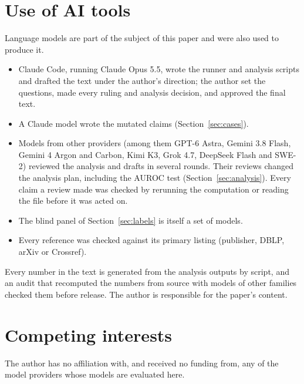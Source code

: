 \documentclass[11pt]{article}
\begin{document}
\section*{Use of AI tools}

Language models are part of the subject of this paper and were also used to produce it.
\begin{itemize}
  \item Claude Code, running Claude Opus 5.5, wrote the runner and analysis scripts and drafted the text under the author's direction; the author set the questions, made every ruling and analysis decision, and approved the final text.
  \item A Claude model wrote the mutated claims (Section~\ref{sec:cases}).
  \item Models from other providers (among them GPT-6 Astra, Gemini 3.8 Flash, Gemini 4 Argon and Carbon, Kimi K3, Grok 4.7, DeepSeek Flash and SWE-2) reviewed the analysis and drafts in several rounds. Their reviews changed the analysis plan, including the AUROC test (Section~\ref{sec:analysis}). Every claim a review made was checked by rerunning the computation or reading the file before it was acted on.
  \item The blind panel of Section~\ref{sec:labels} is itself a set of models.
  \item Every reference was checked against its primary listing (publisher, DBLP, arXiv or Crossref).
\end{itemize}
Every number in the text is generated from the analysis outputs by script, and an audit that recomputed the numbers from source with models of other families checked them before release. The author is responsible for the paper's content.

\section*{Competing interests}

The author has no affiliation with, and received no funding from, any of the model providers whose models are evaluated here.



\end{document}
